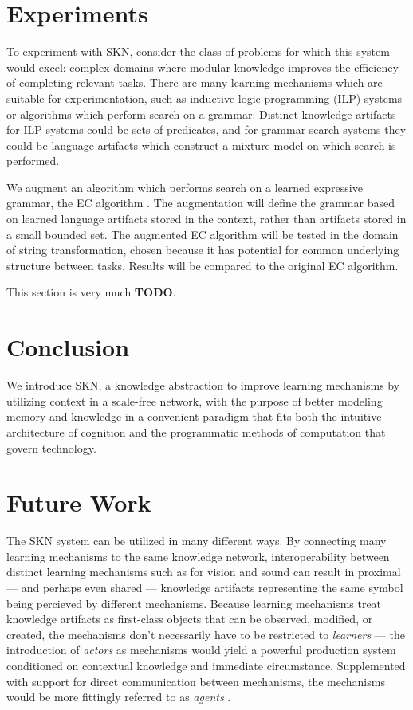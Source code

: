 \documentclass[11pt,letterpaper]{article}
\begin{document}
\section{Experiments}

To experiment with SKN, consider the class of problems for which this system
would excel: complex domains where modular knowledge improves the efficiency
of completing relevant tasks. There are many learning mechanisms which are
suitable for experimentation, such as inductive logic programming (ILP)
systems or algorithms which perform search on a grammar. Distinct knowledge
artifacts for ILP systems could be sets of predicates, and for grammar
search systems they could be language artifacts which construct a mixture
model on which search is performed.

We augment an algorithm which performs search on a learned expressive
grammar, the EC algorithm \cite{dechter13}. The augmentation will define the
grammar based on learned language artifacts stored in the context, rather
than artifacts stored in a small bounded set. The augmented EC algorithm
will be tested in the domain of string transformation, chosen because it has
potential for common underlying structure between tasks. Results will be
compared to the original EC algorithm.

This section is very much {\bf TODO}.


\section{Conclusion}

We introduce SKN, a knowledge abstraction to improve learning mechanisms by
utilizing context in a scale-free network, with the purpose of better
modeling memory and knowledge in a convenient paradigm that fits both the
intuitive architecture of cognition and the programmatic methods of
computation that govern technology.


\section{Future Work}

The SKN system can be utilized in many different ways. By connecting many
learning mechanisms to the same knowledge network, interoperability between
distinct learning mechanisms such as for vision and sound can result in
proximal --- and perhaps even shared --- knowledge artifacts representing
the same symbol being percieved by different mechanisms. Because learning
mechanisms treat knowledge artifacts as first-class objects that can be
observed, modified, or created, the mechanisms don't necessarily have to be
restricted to \emph{learners} --- the introduction of \emph{actors} as
mechanisms would yield a powerful production system conditioned on
contextual knowledge and immediate circumstance. Supplemented with support
for direct communication between mechanisms, the mechanisms would be more
fittingly referred to as
\emph{agents} \cite{minsky88}.
\end{document}
